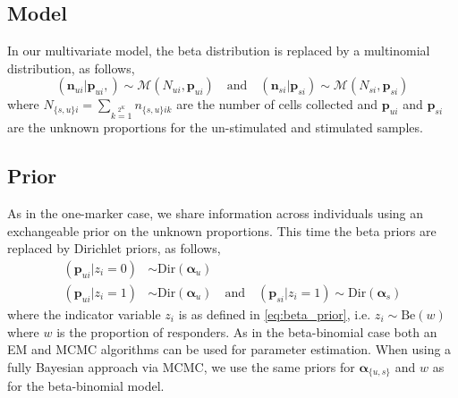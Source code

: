 \documentclass[11pt]{article}
\begin{document}
\subsection{Model}

In our multivariate model, the beta distribution is replaced by a multinomial distribution, as follows,
\begin{equation}
 (\mathbf{n}_{ui}|\mathbf{p}_{ui},) \sim \mathcal{M}(N_{ui},\mathbf{p}_{ui})\quad\text{and}\quad (\mathbf{n}_{si}|\mathbf{p}_{si}) \sim \mathcal{M}(N_{si},\mathbf{p}_{si})\label{eq:mult_likeliehood}
 \end{equation}
where $N_{\{s,u\}i}=\sum\limits_{k=1}\limits^{2^K} n_{\{s,u\}ik}$ are the number of cells collected and $\mathbf{p}_{ui}$ and $\mathbf{p}_{si}$ are the unknown proportions for the un-stimulated and stimulated samples.

\subsection{Prior}
As in the one-marker case, we share information across individuals using an exchangeable prior on the unknown proportions. This time the beta priors are replaced by Dirichlet priors, as follows,
\begin{align}
(\mathbf{p}_{ui}|z_i=0) &\sim \mathrm{Dir}(\boldsymbol{\alpha}_u)\\\nonumber
(\mathbf{p}_{ui}|z_i=1) &\sim \mathrm{Dir}(\boldsymbol{\alpha}_u) \quad \text{and}\quad (\mathbf{p}_{si}|z_i=1) \sim \mathrm{Dir}(\boldsymbol{\alpha}_s)\label{eq:dir_prior}
\end{align}
where the indicator variable $z_i$ is as defined in \eqref{eq:beta_prior}, i.e. $z_i\sim\mathrm{Be}(w)$ where $w$ is the proportion of responders. As in the beta-binomial case both an EM and MCMC algorithms can be used for parameter estimation. When using a fully Bayesian approach via MCMC, we use the same priors for $\boldsymbol{\alpha}_{\{u,s\}}$ and $w$ as for the beta-binomial model. 
\end{document}
